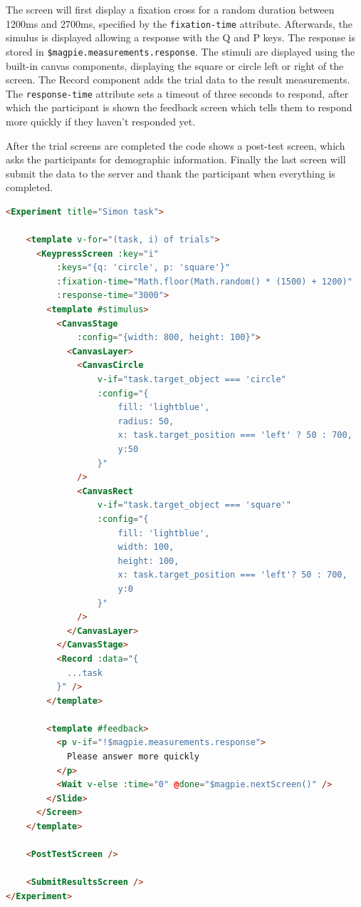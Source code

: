 \documentclass[a4paper,11pt]{scrreprt}
\begin{document}
The screen will first display a fixation cross for a random duration between 1200ms and 2700ms, specified by the \texttt{fixation-time} attribute. Afterwards, the simulus is displayed allowing a response with the Q and P keys. The response is stored in \texttt{\$magpie.measurements.response}. The stimuli are displayed using the built-in canvas components, displaying the square or circle left or right of the screen. The Record component adds the trial data to the result measurements. The \texttt{response-time} attribute sets a timeout of three seconds to respond, after which the participant is shown the feedback screen which tells them to respond more quickly if they haven't responded yet.

After the trial screens are completed the code shows a post-test screen, which asks the participants for demographic information. Finally the last screen will submit the data to the server and thank the participant when everything is completed.

\begin{lstlisting}[language=html]
<Experiment title="Simon task">

    <template v-for="(task, i) of trials">
      <KeypressScreen :key="i"
          :keys="{q: 'circle', p: 'square'}"
          :fixation-time="Math.floor(Math.random() * (1500) + 1200)"
          :response-time="3000">
        <template #stimulus>
          <CanvasStage
              :config="{width: 800, height: 100}">
            <CanvasLayer>
              <CanvasCircle
                  v-if="task.target_object === 'circle"
                  :config="{
                      fill: 'lightblue',
                      radius: 50,
                      x: task.target_position === 'left' ? 50 : 700,
                      y:50
                  }"
              />
              <CanvasRect
                  v-if="task.target_object === 'square'"
                  :config="{
                      fill: 'lightblue',
                      width: 100,
                      height: 100,
                      x: task.target_position === 'left'? 50 : 700,
                      y:0
                  }"
              />
            </CanvasLayer>
          </CanvasStage>
          <Record :data="{
            ...task
          }" />
        </template>

        <template #feedback>
          <p v-if="!$magpie.measurements.response">
          	Please answer more quickly
          </p>
          <Wait v-else :time="0" @done="$magpie.nextScreen()" />
        </Slide>
      </Screen>
    </template>

    <PostTestScreen />

    <SubmitResultsScreen />
</Experiment>
\end{lstlisting}
\end{document}
